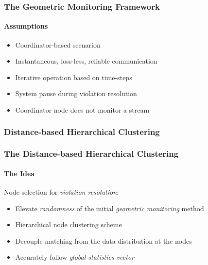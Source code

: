 \documentclass[hyperref={pdfpagelabels=false}]{beamer}
\begin{document}
\begin{frame} \frametitle{The Geometric Monitoring Framework} \framesubtitle{Assumptions}
\noindent\begin{minipage}[t]{0.45\linewidth}
\begin{itemize}\vspace{-2.5cm}
\item Coordinator-based scenarion
\item Instantaneous, loss-less, reliable communication
\item Iterative operation based on time-steps
\item System pause during violation resolution
\item Coordinator node does not monitor a stream
\end{itemize}
\end{minipage}\hfill\noindent{}
\end{frame}

\subsubsection*{Distance-based Hierarchical Clustering}
\begin{frame} \frametitle{The Distance-based Hierarchical Clustering}\framesubtitle{The Idea}
Node selection for \emph{violation resolution}:
\begin{itemize}
\item Elevate \emph{randomness} of the initial \emph{geometric monitoring} method%
\item Hierarchical node clustering scheme%
\item Decouple matching from the data distribution at the nodes%
\item Accurately follow \emph{global statistics vector}
\end{itemize}
\end{frame}
\end{document}
